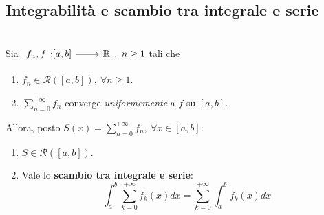 \subsection{Integrabilità e scambio tra integrale e serie}
\begin{theorema}~{}\\
	Sia $\funz{f_n,f}{\left[a,b\right]}{\realset},\ n\geq 1$ tali che
	\begin{enumerate}
		\item $f_n\in\mathcal{R}\left(\left[a,b\right]\right),\ \forall n\geq 1$.
		\item $\displaystyle\sum_{n=0}^{+\infty}f_n$ converge \textit{uniformemente} a $f$ su $\left[a,b\right]$.
	\end{enumerate}
	Allora, posto $\displaystyle S\left(x\right)=\sum_{n=0}^{+\infty}f_n,\ \forall x\in \left[a,b\right]$:
	\begin{enumerate}
		\item $S\in\mathcal{R}\left(\left[a,b\right]\right)$.
		\item Vale lo \textbf{scambio tra integrale e serie}:
		\begin{equation}
			\int_{a}^{b}\sum_{k=0}^{+\infty}f_k\left(x\right)dx=\sum_{k=0}^{+\infty}\int_{a}^{b}f_k\left(x\right)dx
		\end{equation}
	\end{enumerate}
\end{theorema}
